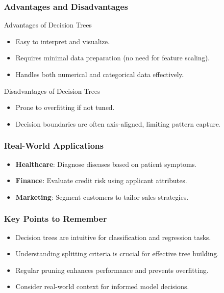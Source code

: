\documentclass[aspectratio=169]{beamer}
\begin{document}
\begin{frame}[fragile]
    \frametitle{Advantages and Disadvantages}
    \begin{block}{Advantages of Decision Trees}
        \begin{itemize}
            \item Easy to interpret and visualize.
            \item Requires minimal data preparation (no need for feature scaling).
            \item Handles both numerical and categorical data effectively.
        \end{itemize}
    \end{block}
    
    \begin{block}{Disadvantages of Decision Trees}
        \begin{itemize}
            \item Prone to overfitting if not tuned.
            \item Decision boundaries are often axis-aligned, limiting pattern capture.
        \end{itemize}
    \end{block}
\end{frame}

\begin{frame}[fragile]
    \frametitle{Real-World Applications}
    \begin{itemize}
        \item \textbf{Healthcare}: Diagnose diseases based on patient symptoms.
        \item \textbf{Finance}: Evaluate credit risk using applicant attributes.
        \item \textbf{Marketing}: Segment customers to tailor sales strategies.
    \end{itemize}
\end{frame}

\begin{frame}[fragile]
    \frametitle{Key Points to Remember}
    \begin{itemize}
        \item Decision trees are intuitive for classification and regression tasks.
        \item Understanding splitting criteria is crucial for effective tree building.
        \item Regular pruning enhances performance and prevents overfitting.
        \item Consider real-world context for informed model decisions.
    \end{itemize}
\end{frame}
\end{document}
